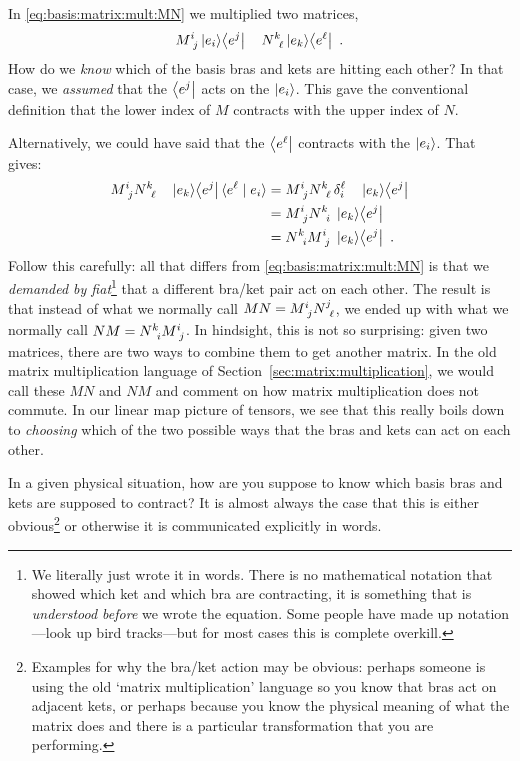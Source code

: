 \documentclass[12pt, oneside]{report}    %
\begin{document}
\begin{example}\label{eg:contraction:choices}
In \eqref{eq:basis:matrix:mult:MN} we multiplied two matrices,
\begin{align}
     M\aij{i}{j} \ket{e_i}\! \bra{e^j} \quad N\aij{k}{\ell}  \ket{e_k}\!\bra{e^\ell} \ .
\end{align}
How do we \emph{know} which of the basis bras and kets are hitting each other? In that case, we \emph{assumed} that the $\left\langle e^j\right|$ acts on the $\left|e_i\right\rangle$. This gave the conventional definition that the lower index of $M$ contracts with the upper index of $N$. 

Alternatively, we could have said that the $\left\langle e^\ell\right|$ contracts with the $\left|e_i\right\rangle$. That gives:
\begin{align}
    M\aij{i}{j} N\aij{k}{\ell} 
    \quad \ket{e_k}\! \bra{e^j}   \la {e^\ell} \mid {e_i} \ra
    &=
    M\aij{i}{j} N\aij{k}{\ell}\, \delta^\ell_i \quad \ket{e_k}\! \bra{e^j}
    \\&=
    M\aij{i}{j} N\aij{k}{i} \; \ket{e_k}\! \bra{e^j}
    \\&=
    N\aij{k}{i}M\aij{i}{j} \; \ket{e_k}\! \bra{e^j}\ .
\end{align}
Follow this carefully: all that differs from \eqref{eq:basis:matrix:mult:MN} is that we \emph{demanded by fiat}\footnote{We literally just wrote it in words. There is no mathematical notation that showed which ket and which bra are contracting, it is something that is \emph{understood before} we wrote the equation. Some people have made up notation---look up bird tracks---but for most cases this is complete overkill.} that a different bra/ket pair act on each other. The result is that instead of what we normally call $MN = M\aij{i}{j}N\aij{j}{\ell}$, we ended up with what we normally call $NM= N\aij{k}{i}M\aij{i}{j}$. In hindsight, this is not so surprising: given two matrices, there are two ways to combine them to get another matrix. In the old matrix multiplication language of Section~\ref{sec:matrix:multiplication}, we would call these $MN$ and $NM$ and comment on how matrix multiplication does not commute. In our linear map picture of tensors, we see that this really boils down to \emph{choosing} which of the two possible ways that the bras and kets can act on each other. 

In a given physical situation, how are you suppose to know which basis bras and kets are supposed to contract? It is almost always the case that this is either obvious\footnote{Examples for why the bra/ket action may be obvious: perhaps someone is using the old `matrix multiplication' language so you know that bras act on adjacent kets, or perhaps because you know the physical meaning of what the matrix does and there is a particular transformation that you are performing.} or otherwise it is communicated explicitly in words. 
\end{example}
\end{document}

